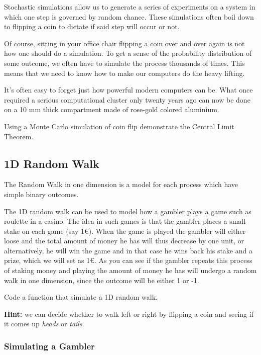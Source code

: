 \documentclass[12pt,a4paper]{article}
\begin{document}
Stochastic simulations allow us to generate a series of experiments on a system in which one step is governed by random chance. These simulations often boil down to flipping a coin to dictate if said step will occur or not.

Of course, sitting in your office chair flipping a coin over and over again is not how one should do a simulation. To get a sense of the probability distribution of some outcome, we often have to simulate the process thousands of times. This means that we need to know how to make our computers do the heavy lifting.

It's often easy to forget just how powerful modern computers can be. What once required a serious computational cluster only twenty years ago can now be done on a 10 mm thick compartment made of rose-gold colored aluminium. 


\begin{question}
Using a Monte Carlo simulation of coin flip demonstrate the Central Limit Theorem.
\end{question}

\subsection{1D Random Walk}
The Random Walk in one dimension is a model for each process which have simple binary outcomes.

The 1D random walk can be used to model how a gambler plays a game such as roulette in a casino. The idea in such games is that the gambler places a small stake on each game (say 1€). When the game is played the gambler will either loose and the total amount of money he has will thus decrease by one unit, or alternatively, he will win the game and in that case he wins back his stake and a prize, which we will set as 1€. As you can see if the gambler repeats this process of staking money and playing the amount of money he has will undergo a random walk in one dimension, since the outcome will be either 1 or -1.

\begin{question}
Code a function that simulate a 1D random walk. 

\noindent
\textbf{Hint:} we can decide whether to walk left or right by flipping a coin and seeing if it comes up \emph{heads} or \emph{tails}.
\end{question}

\subsubsection{Simulating a Gambler}
\end{document}
